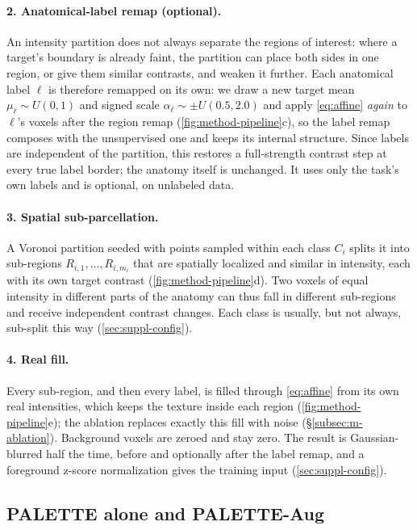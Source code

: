 \paragraph{2. Anatomical-label remap (optional).} An intensity partition
does not always separate the regions of interest: where a target's boundary is
already faint, the partition can place both sides in one region, or give them
similar contrasts, and weaken it further. Each anatomical label $\ell$ is
therefore remapped on its own: we draw a new target mean $\mu_\ell \sim
U(0,1)$ and signed scale $\alpha_\ell \sim \pm U(0.5, 2.0)$ and apply
\cref{eq:affine} \emph{again} to $\ell$'s voxels after the region remap
(\cref{fig:method-pipeline}c), so the label remap composes with the
unsupervised one and keeps its internal structure. Since labels are
independent of the partition, this restores a full-strength contrast step at
every true label border; the anatomy itself is unchanged. It uses only the
task's own labels and is optional, \eg on unlabeled data.

\paragraph{3. Spatial sub-parcellation.} A Voronoi partition seeded with
points sampled within each class $C_i$ splits it into sub-regions
$R_{i,1}, \dots, R_{i,m_i}$ that are spatially localized and similar in
intensity, each with its own target contrast (\cref{fig:method-pipeline}d).
Two voxels of equal intensity in different parts of the anatomy can thus fall
in different sub-regions and receive independent contrast changes. Each class
is usually, but not always, sub-split this way (\cref{sec:suppl-config}).

\paragraph{4. Real fill.} Every sub-region, and then every label, is filled
through \cref{eq:affine} from its own real intensities, which keeps the
texture inside each region (\cref{fig:method-pipeline}e); the ablation
replaces exactly this fill with noise (\S\ref{subsec:m-ablation}). Background
voxels are zeroed and stay zero. The result is Gaussian-blurred half the time,
before and optionally after the label remap, and a foreground z-score
normalization gives the training input (\cref{sec:suppl-config}).


\subsection{PALETTE alone and PALETTE-Aug}
\label{subsec:m-training}

